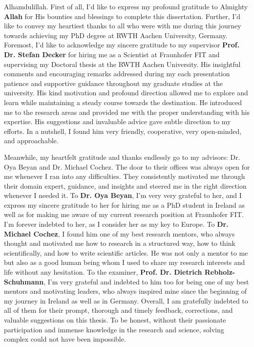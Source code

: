 

\begin{acknowledgements}
    Alhamdulillah. First of all, I'd like to express my profound gratitude to Almighty \textbf{Allah} for His bounties and blessings to complete this dissertation. Further, I'd like to convey my heartiest thanks to all who were with me during this journey towards achieving my PhD degree at RWTH Aachen University, Germany. Foremost, I'd like to acknowledge my sincere gratitude to my supervisor \textbf{Prof. Dr. Stefan Decker} for hiring me as a Scientist at Fraunhofer FIT and supervising my Doctoral thesis at the RWTH Aachen University. His insightful comments and encouraging remarks addressed during my each presentation patience and supportive guidance throughout my graduate studies at the university. His kind motivation and profound direction allowed me to explore and learn while maintaining a steady course towards the destination. He introduced me to the research areas and provided me with the proper understanding with his expertise. His suggestions and invaluable advice gave subtle direction to my efforts. In a nutshell, I found him very friendly, cooperative, very open-minded, and approachable. 
    
    \hspace*{5mm} Meanwhile, my heartfelt gratitude and thanks endlessly go to my advisors: Dr. Oya Beyan and Dr. Michael Cochez. The door to their offices was always open for me whenever I ran into any difficulties. They consistently motivated me through their domain expert, guidance, and insights and steered me in the right direction whenever I needed it. To \textbf{Dr. Oya Beyan}, I'm very very grateful to her, and I express my sincere gratitude to her for hiring me as a PhD student in Ireland as well as for making me aware of my current research position at Fraunhofer FIT. I'm forever indebted to her, as I consider her as my key to Europe. To \textbf{Dr. Michael Cochez}, I found him one of my best research mentors, who always thought and motivated me how to research in a structured way, how to think scientifically, and how to write scientific articles. He was not only a mentor to me but also as a good human being whom I used to share my research interests and life without any hesitation. To the examiner, \textbf{Prof. Dr. Dietrich Rebholz-Schuhmann}, I'm very grateful and indebted to him too for being one of my best mentors and motivating leaders, who always inspired mine since the beginning of my journey in Ireland as well as in Germany. Overall, I am gratefully indebted to all of them for their prompt, thorough and timely feedback, corrections, and valuable suggestions on this thesis. To be honest, without their passionate participation and immense knowledge in the research and science, solving complex could not have been impossible.  
    

\end{acknowledgements}
